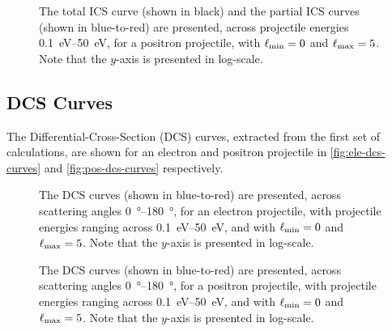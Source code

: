 \documentclass{article}
\begin{document}
\begin{figure}[h]
  \begin{center}
    
  \end{center}
  \caption[Positron ICS Curves]{
    The total ICS curve (shown in black) and the partial ICS curves (shown in
    blue-to-red) are presented, across projectile energies
    \SIrange{0.1}{50}{\eV}, for a positron projectile, with
    $\ell_{\rm{min}} = 0$ and $\ell_{\rm{max}} = 5$.
    Note that the $y$-axis is presented in log-scale.
  }
  \label{fig:pos-ics-curves}
\end{figure}

\clearpage

\subsection{DCS Curves}
\label{sec:dcs-curves}

The Differential-Cross-Section (DCS) curves, extracted from the first set
of calculations, are shown for an electron and positron projectile in
\autoref{fig:ele-dcs-curves} and \autoref{fig:pos-dcs-curves} respectively.

\begin{figure}[h]
  \begin{center}
    
  \end{center}
  \caption[Electron DCS Curves]{
    The DCS curves (shown in blue-to-red) are presented, across scattering
    angles \SIrange{0}{180}{\degree}, for an electron projectile, with
    projectile energies ranging across \SIrange{0.1}{50}{\eV}, and with
    $\ell_{\rm{min}} = 0$ and $\ell_{\rm{max}} = 5$.
    Note that the $y$-axis is presented in log-scale.
  }
  \label{fig:ele-dcs-curves}
\end{figure}

\begin{figure}[h]
  \begin{center}
    
  \end{center}
  \caption[Positron DCS Curves]{
    The DCS curves (shown in blue-to-red) are presented, across scattering
    angles \SIrange{0}{180}{\degree}, for a positron projectile, with
    projectile energies ranging across \SIrange{0.1}{50}{\eV}, and with
    $\ell_{\rm{min}} = 0$ and $\ell_{\rm{max}} = 5$.
    Note that the $y$-axis is presented in log-scale.
  }
  \label{fig:pos-dcs-curves}
\end{figure}
\end{document}
